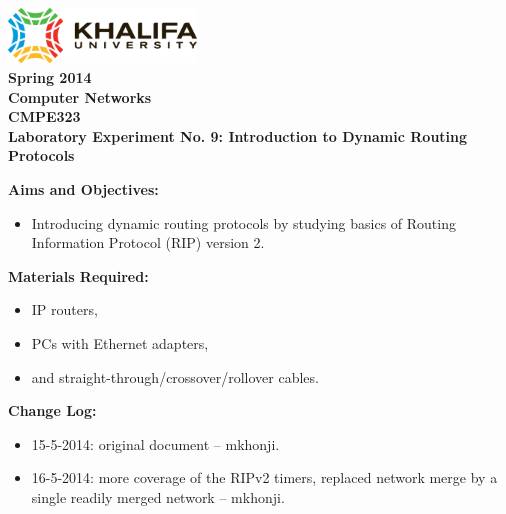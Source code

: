 \documentclass[pdftex,12pt,a4paper]{article}
\begin{document}
    \begin{titlepage}
        \begin{center}
            \includegraphics[width=5cm]{figures/kulogo}\\[1cm]
            {\Large \bfseries
                Spring 2014\\
                Computer Networks\\
                CMPE323\\[1cm]
            }
            {\large \bfseries
                \noindent Laboratory Experiment No. 9: Introduction to Dynamic
                Routing Protocols\\[1cm]
            }
        \end{center}

        \noindent \textbf{Aims and Objectives:}
            \begin{itemize}[leftmargin=4cm]
                \item Introducing dynamic routing protocols by studying basics
                    of Routing Information Protocol (RIP) version 2.
            \end{itemize}
            \vspace{0.5cm}

        \noindent \textbf{Materials Required:}
            \begin{itemize}[leftmargin=4cm]
                \item IP routers,
                \item PCs with Ethernet adapters,
                \item and straight-through/crossover/rollover cables.
            \end{itemize}
            \vspace{0.5cm}

        \noindent \textbf{Change Log:}
            \begin{itemize}[leftmargin=4cm]
                \item 15-5-2014: original document -- mkhonji.
                \item 16-5-2014: more coverage of the RIPv2 timers, replaced 
                    network merge by a single readily merged network -- mkhonji.
            \end{itemize}
    \end{titlepage}
    \newpage
\end{document}
